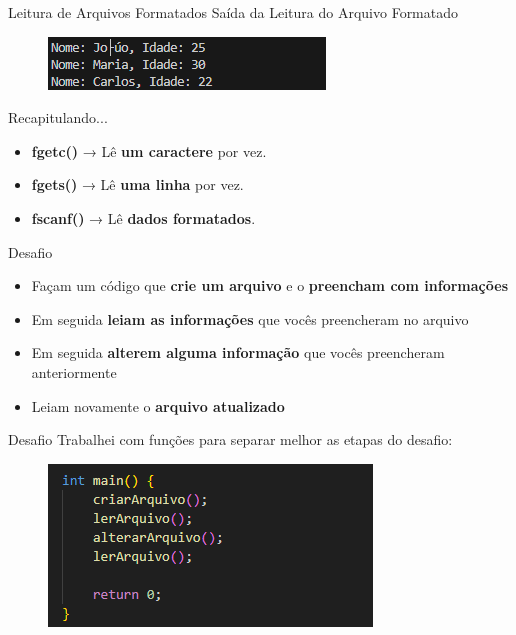\begin{frame}{Leitura de Arquivos Formatados}
Saída da Leitura do Arquivo Formatado
\begin{figure}
    \centering
    \includegraphics[width=0.75\linewidth]{figuras/ArqForm3.png}
\end{figure}
\end{frame}

\begin{frame}{Recapitulando...}
\begin{itemize}
    \item \textbf{fgetc()} → Lê \textbf{um caractere} por vez.
    \item \textbf{fgets()} → Lê \textbf{uma linha} por vez.
    \item \textbf{fscanf()} → Lê \textbf{dados formatados}.
\end{itemize}
    
\end{frame}
\begin{frame}{Desafio}
\begin{itemize}
    \item Façam um código que \textbf{crie um arquivo} e o \textbf{preencham com informações}
    \item Em seguida \textbf{leiam as informações} que vocês preencheram no arquivo
    \item Em seguida \textbf{alterem alguma informação} que vocês preencheram anteriormente
    \item Leiam novamente o \textbf{arquivo atualizado}
\end{itemize}
\end{frame}

\begin{frame}{Desafio}
Trabalhei com funções para separar melhor as etapas do desafio:
\begin{figure}
    \centering
    \includegraphics[width=0.75\linewidth]{figuras/Cod1.png}
\end{figure}
\end{frame}

